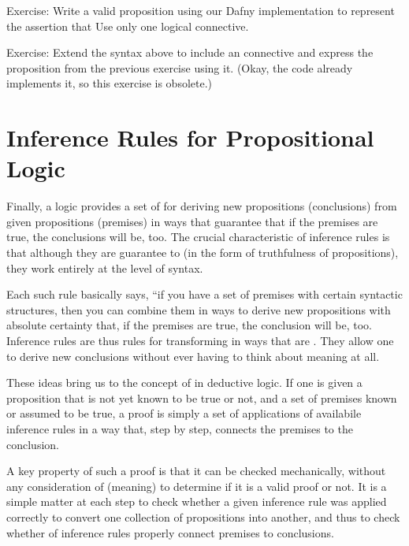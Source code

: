 \documentclass[letterpaper,10pt,english]{sphinxmanual}
\begin{document}
Exercise: Write a valid proposition using our Dafny implementation to
represent the assertion that  Use only one logical connective.

Exercise: Extend the syntax above to include an  connective
and express the proposition from the previous exercise using it. (Okay,
the code already implements it, so this exercise is obsolete.)


\section{Inference Rules for Propositional Logic}
\label{\detokenize{09-propositional-logic:inference-rules-for-propositional-logic}}
Finally, a logic provides a set of  for deriving new
propositions (conclusions) from given propositions (premises) in ways
that guarantee that if the premises are true, the conclusions will be,
too. The crucial characteristic of inference rules is that although
they are guarantee to  (in the form of truthfulness
of propositions), they work entirely at the level of syntax.

Each such rule basically says, “if you have a set of premises with
certain syntactic structures, then you can combine them in ways to
derive new propositions with absolute certainty that, if the premises
are true, the conclusion will be, too.  Inference rules are thus rules
for transforming  in ways that are . They
allow one to derive  new conclusions without ever having
to think about meaning at all.

These ideas bring us to the concept of  in deductive logic. If
one is given a proposition that is not yet known to be true or not,
and a set of premises known or assumed to be true, a proof is simply a
set of applications of availabile inference rules in a way that, step
by step, connects the premises  to the conclusion.

A key property of such a proof is that it can be checked mechanically,
without any consideration of  (meaning) to determine if it
is a valid proof or not. It is a simple matter at each step to check
whether a given inference rule was applied correctly to convert one
collection of propositions into another, and thus to check whether
 of inference rules properly connect premises to conclusions.
\end{document}
